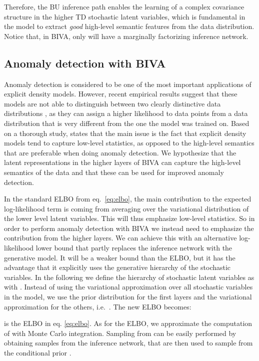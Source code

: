 \documentclass{article}
\def\nm{BIVA\xspace}
\begin{document}
Therefore, the BU inference path enables the learning of a complex covariance structure in the higher TD stochastic latent variables, which is fundamental in the model to extract \textit{good} high-level semantic features from the data distribution. Notice that, in \nm, only  will have a marginally factorizing inference network.



\subsection{Anomaly detection with \nm}
Anomaly detection is considered to be one of the most important applications of explicit density models. 
However, recent empirical results suggest that these models are not able to distinguish between two clearly distinctive data distributions  \citep{Nalisnick18}, as they can assign a higher likelihood to data points from a data distribution that is very different from the one the model was trained on. 
Based on a thorough study, \citep{Nalisnick18} states that the main issue is the fact that explicit density models tend to capture low-level statistics, as opposed to the high-level semantics that are preferable when doing anomaly detection.
We hypothesize that the latent representations in the higher layers of \nm can capture the high-level semantics of the data and that these can be used for improved anomaly detection.  

In the standard ELBO from eq.~\eqref{eq:elbo}, the main contribution to the expected log-likelihood term is coming from averaging over the variational distribution of the lower level latent variables. This will thus emphasize low-level statistics. So in order to perform anomaly detection with \nm we instead need to emphasize the contribution from the higher layers. We can achieve this with an alternative log-likelihood lower bound that partly replaces the inference network with the generative model. It will be a weaker bound than the ELBO, but it has the advantage that it explicitly uses the generative hierarchy of the stochastic variables.
In the following we define  
the hierarchy of stochastic latent variables as  with .
Instead of using the variational approximation  over all stochastic variables in the model, we use the prior distribution for the first  layers and the variational approximation for the others, i.e.~. 
The new ELBO becomes:

 is the ELBO in eq. \eqref{eq:elbo}. As for the ELBO, we approximate the computation of  with Monte Carlo integration. 
Sampling from  can be easily performed by obtaining samples  from the inference network, that are then used to sample  from the conditional prior .
\end{document}

